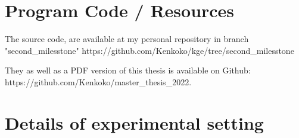 \appendix



\chapter{Program Code / Resources}
\label{cha:appendix-a}

The source code, are available at my personal repository in branch "second\_milesstone" https://github.com/Kenkoko/kge/tree/second\_milesstone

They as well as a PDF version of this thesis is available on Github: https://github.com/Kenkoko/master\_thesis\_2022.

\chapter{Details of experimental setting}
\label{cha:details of experimental setting}

